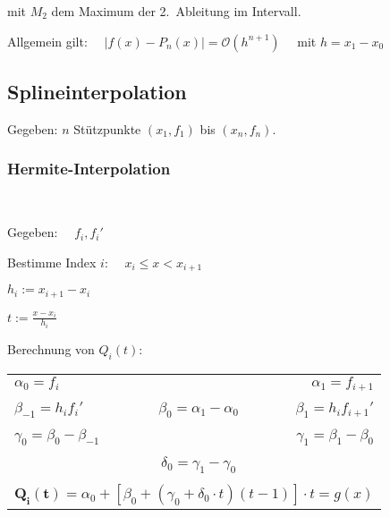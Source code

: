 			mit $M_2$ dem Maximum der 2.~Ableitung im Intervall.
			
			Allgemein gilt: $\displaystyle\quad |f(x)-P_n(x)|=\mathcal{O}(h^{n+1}) \quad$ mit $h=x_1 - x_0$

	\subsection{Splineinterpolation}
		Gegeben: $n$ Stützpunkte $(x_1,f_1)$ bis $(x_n,f_n)$. 
		
		\subsubsection{Hermite-Interpolation}
			\begin{algo} ~
				
				Gegeben: $\quad f_i , f_i'$
				
				\begin{tightenumerate}
					\item Bestimme Index $i$: $\quad x_i\leq x < x_{i+1}$
					\item $ h_i := x_{i+1}-x_i$ 
					\item $\displaystyle t := \frac{x-x_i}{h_i}$ 
					\item Berechnung von $Q_i(t)$: 
				\end{tightenumerate}
				\begin{center}
					\begin{tabular}
						{lrlr} \toprule $\alpha_0 = f_i$ & & &$\alpha_1 = f_{i+1}$ \\
						& & & \\
						$\beta_{-1} = h_i f_i' $& \multicolumn{2}{c}{$ \beta_0 = \alpha_1 - \alpha_0$} & $\beta_1 = h_i f_{i+1}'$\\
						& & & \\
						$\gamma_0 = \beta_0 - \beta_{-1}$ & & & $\gamma_1 = \beta_1 - \beta_0$ \\
						& & & \\
						& \multicolumn{2}{c}{$ \delta_0 = \gamma_1 - \gamma_0$}\\
						& & & \\
						\multicolumn{4}{c}{$\mathbf{Q_i(t)} = \alpha_0 + \left[ \beta_0 + (\gamma_0 + \delta_0 \cdot t)(t-1)\right]\cdot t = g(x)$}\\
						\bottomrule 
					\end{tabular}
				\end{center}
			\end{algo}
